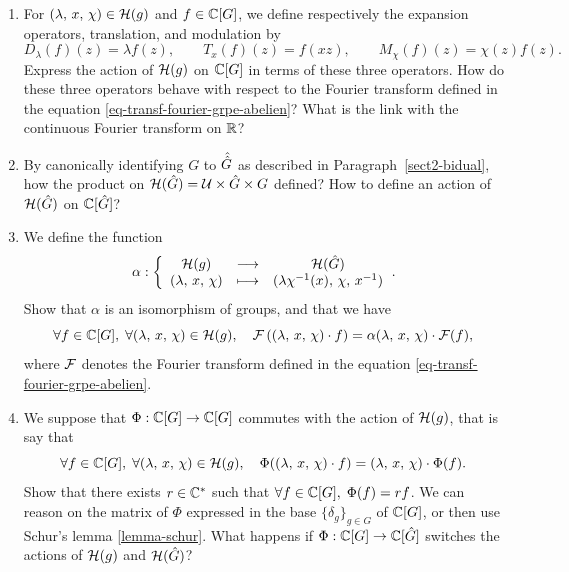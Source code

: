 \begin{exo}
\begin{enumerate}
\item {} For $(\lambda, \, x, \, \chi) \in \mathcal{H}(g)$ and $ f \in \mathbb{C}[G]$, we define respectively the expansion operators, translation, and modulation by
\begin{equation*}
D_ \lambda (f) (z) = \lambda f (z), \quad \quad T_x (f) (z) = f (xz), \quad \quad M_ \chi(f) (z) = \chi(z) f (z).
\end{equation*}
Express the action of $\mathcal{H}(g)$ on $\mathbb{C}[G]$ in terms of these three operators. How do these three operators behave with respect to the Fourier transform defined in the equation \eqref{eq-transf-fourier-grpe-abelien}? What is the link with the continuous Fourier transform on $\mathbb{R} $?
\item {} By canonically identifying $G$ to $\hat{\hat{G}}$ as described in Paragraph~\ref{sect2-bidual}, how the product on $\mathcal{H}(\hat{G}) = \mathcal{U} \times \hat{G} \times G$ defined? How to define an action of $\mathcal{H}(\hat{G})$ on $\mathbb{C}[\hat{G}]$?
\item We define the function
\begin{equation*}
\alpha: {\left\{ \begin{array}{ccc} \mathcal{H}(g) & \longrightarrow & \mathcal{H}(\hat{G}) \\ (\lambda, \, x, \, \chi) & \longmapsto & (\lambda \chi^{-1} ( x), \, \chi, \, x^{-1}) \end{array} \right.}.
\end{equation*}
Show that $\alpha$ is an isomorphism of groups, and that we have
\begin{equation*}
\forall f \in \mathbb{C}[G], \; \forall(\lambda, \, x, \, \chi) \in \mathcal{H}(g), \quad \mathcal{F} \left((\lambda, \, x, \, \chi) \cdot f \right) = \alpha(\lambda, \, x, \, \chi) \cdot \mathcal{F} (f),
\end{equation*}
where $\mathcal{F} $ denotes the Fourier transform defined in the equation \eqref{eq-transf-fourier-grpe-abelien}.
\item {} We suppose that $\Phi: \mathbb{C}[G] \rightarrow \mathbb{C}[G]$ commutes with the action of $\mathcal{H}(g)$, that is say that
\begin{equation*}
\forall f \in \mathbb{C}[G], \; \forall(\lambda, \, x, \, \chi) \in \mathcal{H}(g), \quad \Phi((\lambda, \, x, \, \chi) \cdot f) =(\lambda, \, x, \, \chi) \cdot \Phi(f).
\end{equation*}
Show that there exists $ r \in \mathbb{C}^*$ such that $\forall f \in \mathbb{C}[G], \; \Phi(f) = r f $. We can reason on the matrix of $\Phi $ expressed in the base $\{\delta_g\}_{g \in G}$ of $\mathbb{C}[G]$, or then use Schur's lemma \ref{lemma-schur}. What happens if $\Phi: \mathbb{C}[G] \rightarrow \mathbb{C}[\hat{G}]$ switches the actions of $\mathcal{H}(g)$ and $\mathcal{H}(\hat{G})$?
\end{enumerate}
\end{exo}



